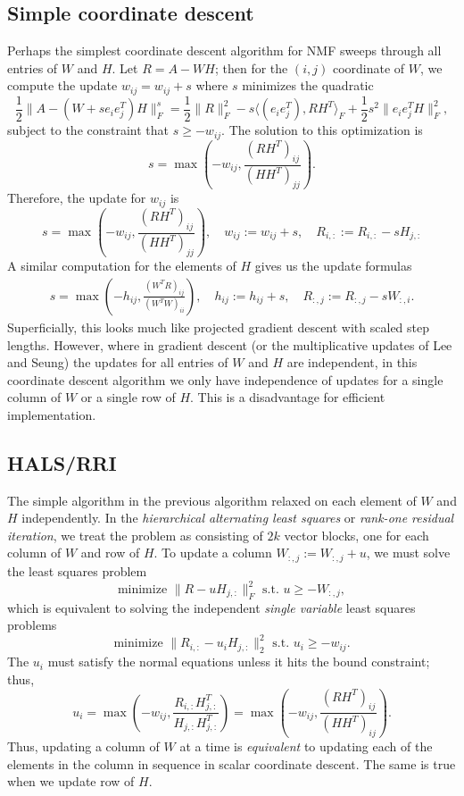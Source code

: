 \documentclass[12pt, leqno]{article} %
\begin{document}
\subsection{Simple coordinate descent}

Perhaps the simplest coordinate descent algorithm for NMF sweeps
through all entries of $W$ and $H$.  Let $R = A-WH$; then for the
$(i,j)$ coordinate of $W$, we compute the update
$w_{ij} = w_{ij} + s$ where $s$ minimizes the quadratic
\[
\frac{1}{2} \|A-(W+se_i e_j^T) H\|_F^s =
\frac{1}{2} \|R\|_F^2 -
s \langle (e_i e_j^T) , RH^T \rangle_F +
\frac{1}{2} s^2 \|e_i e_j^T H\|_F^2,
\]
subject to the constraint that $s \geq -w_{ij}$.  The solution to
this optimization is
\[
  s = \max\left( -w_{ij}, \frac{(RH^T)_{ij}}{(HH^T)_{jj}} \right).
\]
Therefore, the update for $w_{ij}$ is
\[
  s = \max\left( -w_{ij}, \frac{(RH^T)_{ij}}{(HH^T)_{jj}} \right), \quad
  w_{ij} := w_{ij} + s, \quad
  R_{i,:} := R_{i,:} - s H_{j,:}
\]
A similar computation for the elements of $H$ gives us the update formulas
\begin{align*}
  s = \max\left( -h_{ij}, \frac{(W^TR)_{ij}}{(W^TW)_{ii}} \right), \quad
  h_{ij} := h_{ij} + s, \quad
  R_{:,j} := R_{:,j} - s W_{:,i}.
\end{align*}
Superficially, this looks much like projected gradient descent with
scaled step lengths.  However, where in gradient descent (or the
multiplicative updates of Lee and Seung) the updates for all entries
of $W$ and $H$ are independent, in this coordinate descent algorithm
we only have independence of updates for a single column of $W$ or a
single row of $H$.  This is a disadvantage for efficient implementation.

\subsection{HALS/RRI}

The simple algorithm in the previous algorithm relaxed on each element
of $W$ and $H$ independently.  In the
{\em hierarchical alternating least squares} or
{\em rank-one residual iteration}, we treat the problem as consisting
of $2k$ vector blocks, one for each column of $W$ and row of $H$.
To update a column $W_{:,j} := W_{:,j} + u$, we must solve the least
squares problem
\[
  \mbox{minimize } \|R-u H_{j,:}\|_F^2 \mbox{ s.t.~} u \geq -W_{:,j},
\]
which is equivalent to solving the independent {\em single variable}
least squares problems
\[
  \mbox{minimize } \|R_{i,:}-u_i H_{j,:}\|_2^2 \mbox{~s.t.~} u_i \geq -w_{ij}.
\]
The $u_i$ must satisfy the normal equations unless it hits the bound
constraint; thus,
\[
  u_i
  = \max\left( -w_{ij}, \frac{R_{i,:} H_{j,:}^T}{H_{j,:} H_{j,:}^T}
    \right)
  = \max\left( -w_{ij}, \frac{(RH^T)_{ij}}{(HH^T)_{ij}} \right).    
\]
Thus, updating a column of $W$ at a time is {\em equivalent} to
updating each of the elements in the column in sequence in
scalar coordinate descent.  The same is true when we update row
of $H$.
\end{document}
